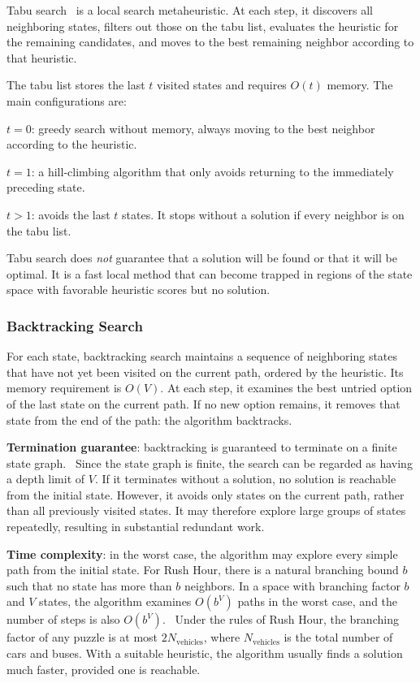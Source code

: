 Tabu search~\cite{glover1989tabu} is a local search metaheuristic. At each step, it discovers all neighboring states, filters out those on the tabu list, evaluates the heuristic for the remaining candidates, and moves to the best remaining neighbor according to that heuristic.

The tabu list stores the last $t$ visited states and requires $O(t)$ memory. The main configurations are:
\begin{compactitem}
\item $t = 0$: greedy search without memory, always moving to the best neighbor according to the heuristic.
\item $t = 1$: a hill-climbing algorithm that only avoids returning to the immediately preceding state.
\item $t > 1$: avoids the last $t$ states. It stops without a solution if every neighbor is on the tabu list.
\end{compactitem}

Tabu search does \emph{not} guarantee that a solution will be found or that it will be optimal. It is a fast local method that can become trapped in regions of the state space with favorable heuristic scores but no solution.

\subsubsection{Backtracking Search}
\label{sec:backtracking}

For each state, backtracking search maintains a sequence of neighboring states that have not yet been visited on the current path, ordered by the heuristic. Its memory requirement is $O(V)$. At each step, it examines the best untried option of the last state on the current path. If no new option remains, it removes that state from the end of the path: the algorithm backtracks.

\textbf{Termination guarantee}: backtracking is guaranteed to terminate on a finite state graph.~\cite[p.~46, paragraph~3]{gregorics_2006_bevezetes} \cite[p.~19]{gregorics_backtrack} Since the state graph is finite, the search can be regarded as having a depth limit of $V$. If it terminates without a solution, no solution is reachable from the initial state. However, it avoids only states on the current path, rather than all previously visited states. It may therefore explore large groups of states repeatedly, resulting in substantial redundant work.

\textbf{Time complexity}: in the worst case, the algorithm may explore every simple path from the initial state. For Rush Hour, there is a natural branching bound $b$ such that no state has more than $b$ neighbors. In a space with branching factor $b$ and $V$ states, the algorithm examines $O(b^V)$ paths in the worst case, and the number of steps is also $O(b^V)$.~\cite[Section~3.4]{russellnorvig2020} Under the rules of Rush Hour, the branching factor of any puzzle is at most $2 N_{\text{vehicles}}$, where $N_{\text{vehicles}}$ is the total number of cars and buses. With a suitable heuristic, the algorithm usually finds a solution much faster, provided one is reachable.

